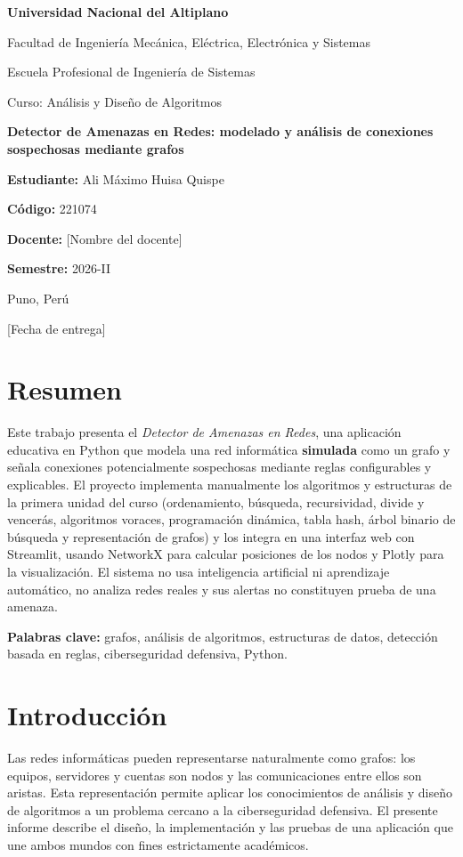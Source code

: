 \documentclass[12pt,a4paper]{article}
\newcommand{\universidad}{Universidad Nacional del Altiplano}
\newcommand{\facultad}{Facultad de Ingeniería Mecánica, Eléctrica, Electrónica y Sistemas}
\newcommand{\escuela}{Escuela Profesional de Ingeniería de Sistemas}
\newcommand{\curso}{Análisis y Diseño de Algoritmos}
\newcommand{\titulotrabajo}{Detector de Amenazas en Redes: modelado y análisis de conexiones sospechosas mediante grafos}
\newcommand{\estudiante}{Ali Máximo Huisa Quispe}
\newcommand{\codigo}{221074}
\newcommand{\docente}{[Nombre del docente]}
\newcommand{\semestre}{2026-II}
\newcommand{\ciudad}{Puno, Perú}
\newcommand{\fechaentrega}{[Fecha de entrega]}
\begin{document}
\begin{titlepage}
\centering
{\Large\bfseries \universidad\par}
\vspace{0.3cm}
{\large \facultad\par}
{\large \escuela\par}
\vspace{2cm}
{\large Curso: \curso\par}
\vspace{1.5cm}
{\LARGE\bfseries \titulotrabajo\par}
\vspace{2cm}
{\large\textbf{Estudiante:} \estudiante\par}
{\large\textbf{Código:} \codigo\par}
{\large\textbf{Docente:} \docente\par}
{\large\textbf{Semestre:} \semestre\par}
\vfill
{\large \ciudad\par}
{\large \fechaentrega\par}
\end{titlepage}

\tableofcontents
\clearpage
\listoftables
\clearpage
{}

\section*{Resumen}
Este trabajo presenta el \emph{Detector de Amenazas en Redes}, una aplicación educativa en Python que modela una red informática \textbf{simulada} como un grafo y señala conexiones potencialmente sospechosas mediante reglas configurables y explicables. El proyecto implementa manualmente los algoritmos y estructuras de la primera unidad del curso (ordenamiento, búsqueda, recursividad, divide y vencerás, algoritmos voraces, programación dinámica, tabla hash, árbol binario de búsqueda y representación de grafos) y los integra en una interfaz web con Streamlit, usando NetworkX para calcular posiciones de los nodos y Plotly para la visualización. El sistema no usa inteligencia artificial ni aprendizaje automático, no analiza redes reales y sus alertas no constituyen prueba de una amenaza.

\noindent\textbf{Palabras clave:} grafos, análisis de algoritmos, estructuras de datos, detección basada en reglas, ciberseguridad defensiva, Python.

\section{Introducción}
Las redes informáticas pueden representarse naturalmente como grafos: los equipos, servidores y cuentas son nodos y las comunicaciones entre ellos son aristas. Esta representación permite aplicar los conocimientos de análisis y diseño de algoritmos a un problema cercano a la ciberseguridad defensiva. El presente informe describe el diseño, la implementación y las pruebas de una aplicación que une ambos mundos con fines estrictamente académicos.
\end{document}
